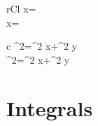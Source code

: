 \documentclass{article}
\begin{document}
\begin{definition}
	\begin{IEEEeqnarray*}{rCl}
		\sinh x=\\
		\cosh x=
	\end{IEEEeqnarray*}
\end{definition}
\begin{proposition}
	\begin{IEEEeqnarray*}{c}
		^2=\sin^2 x+\sinh^2 y\\
		^2=\cos^2 x+\sinh^2 y
	\end{IEEEeqnarray*}
\end{proposition}
\section{Integrals}
\end{document}
